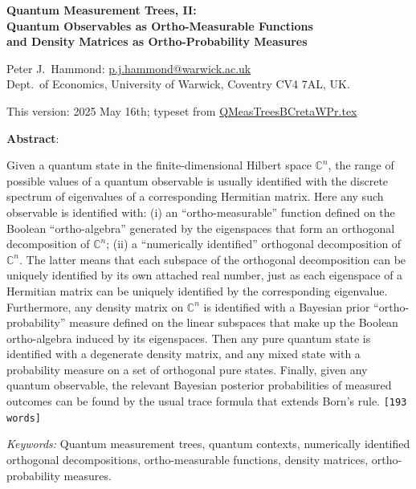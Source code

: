 \documentclass[11pt]{article}
\newcommand \C { \mathbb{C} }
\begin{document}
 

\begin{titlepage}

\begin{center}

\textbf{\large Quantum Measurement Trees, II: \\
Quantum Observables as Ortho-Measurable Functions \\
and Density Matrices as Ortho-Probability Measures}

\medskip
Peter J.\ Hammond: \url{p.j.hammond@warwick.ac.uk} \\
Dept.\ of Economics, University of Warwick, Coventry CV4 7AL, UK.

\medskip
This version: 2025 May 16th; typeset from \url{QMeasTreesBCretaWPr.tex}

\bigskip
\textbf{Abstract}:
\end{center}\noindent
Given a quantum state in the finite-dimensional Hilbert space $ \C^n $,  
the range of possible values of a quantum observable 
is usually identified with the discrete spectrum of eigenvalues 
of a corresponding Hermitian matrix.
Here any such observable is identified with:
(i) an ``ortho-measurable'' function 
defined on the Boolean ``ortho-algebra'' generated by the eigenspaces 
that form an orthogonal decomposition of $ \C^n $;
(ii) a ``numerically identified'' orthogonal decomposition of $ \C^n $.
The latter means that each subspace of the orthogonal decomposition 
can be uniquely identified by its own attached real number, 
just as each eigenspace of a Hermitian matrix 
can be uniquely identified by the corresponding eigenvalue.
Furthermore, any density matrix on $ \C^n $ is identified 
with a Bayesian prior ``ortho-probability'' measure defined on the linear subspaces 
that make up the Boolean ortho-algebra induced by its eigenspaces.
Then any pure quantum state is identified with a degenerate density matrix,
and any mixed state with a probability measure on a set of orthogonal pure states.
Finally, given any quantum observable, 
the relevant Bayesian posterior probabilities of measured outcomes 
can be found by the usual trace formula that extends Born's rule.
\texttt{[193 words]}

\bigskip \noindent

\textit{Keywords:} Quantum measurement trees, quantum contexts, 
numerically identified orthogonal decompositions, ortho-measurable functions, 
density matrices, ortho-probability measures.

\end{titlepage}
\end{document}

